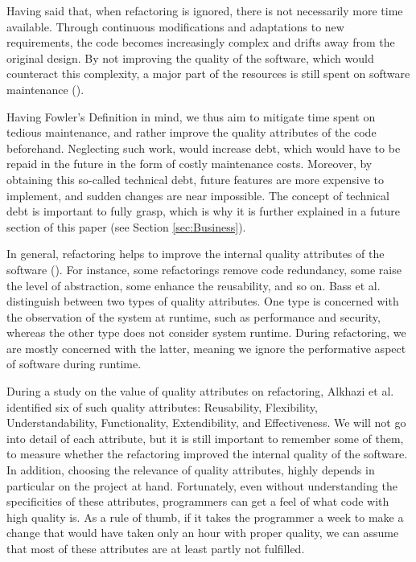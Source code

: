 Having said that, when refactoring is ignored, there is not necessarily more time available.
Through continuous modifications and adaptations to new requirements, 
	the code becomes increasingly complex and drifts away from the original design.
By not improving the quality of the software, which would counteract this complexity, 
	a major part of the resources is still spent on software maintenance (\cite[p.~1]{mens2003}). 

Having Fowler's Definition in mind, 
	we thus aim to mitigate time spent on tedious maintenance, 
	and rather improve the quality attributes of the code beforehand.
Neglecting such work, would increase debt, 
	which would have to be repaid in the future in the form of costly maintenance costs.
Moreover, by obtaining this so-called technical debt, 
	future features are more expensive to implement, and sudden changes are near impossible. 
The concept of technical debt is important to fully grasp, 
	which is why it is further explained in a future section of this paper 
(see Section \ref{sec:Business}).


In general, refactoring helps to improve the internal quality attributes of the software (\cite[p.~129]{mens2004}). 
For instance, some refactorings remove code redundancy, 
	some raise the level of abstraction, 
	some enhance the reusability, and so on.
Bass et al. \textcite{bass1998} distinguish 
	between two types of quality attributes. 
One type is concerned with the observation of the system at runtime, 
	such as performance and security, 
	whereas the other type does not consider  system runtime.
During refactoring, we are mostly concerned with the latter, 
	meaning we ignore the performative aspect of software during runtime.

During a study on the value of quality attributes on refactoring, 
	Alkhazi et al. \textcite[p.~4]{alkhazi2020} identified 
	six of such quality attributes: 
	Reusability, Flexibility, Understandability, 
	Functionality, Extendibility, and Effectiveness.
We will not go into detail of each attribute, 
	but it is still important to remember some of them,
   to measure whether the refactoring improved the internal quality of the software.
In addition, choosing the relevance of quality attributes,
	highly depends in particular on the project at hand.
Fortunately, even without understanding the specificities of these attributes,
	programmers can get a feel of what code with high quality is.
As a rule of thumb, 
	if it takes the programmer a week to make a change 
	that would have taken only an hour with proper quality, 
	we can assume that most of these attributes are at 
	least partly not fulfilled.

